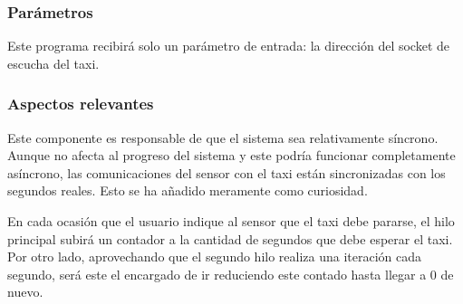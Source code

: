 \documentclass[a4paper,12pt]{article}
\begin{document}
\subsubsection{Parámetros}
Este programa recibirá solo un parámetro de entrada: la dirección del socket de escucha del taxi. \par
\subsubsection{Aspectos relevantes}
Este componente es responsable de que el sistema sea relativamente síncrono. Aunque no afecta al progreso del sistema y este podría
funcionar completamente asíncrono, las comunicaciones del sensor con el taxi están sincronizadas con los segundos reales. Esto
se ha añadido meramente como curiosidad. \par
En cada ocasión que el usuario indique al sensor que el taxi debe pararse, el hilo principal subirá un contador a la cantidad de
segundos que debe esperar el taxi. Por otro lado, aprovechando que el segundo hilo realiza una iteración cada segundo, será este
el encargado de ir reduciendo este contado hasta llegar a 0 de nuevo.
\end{document}
